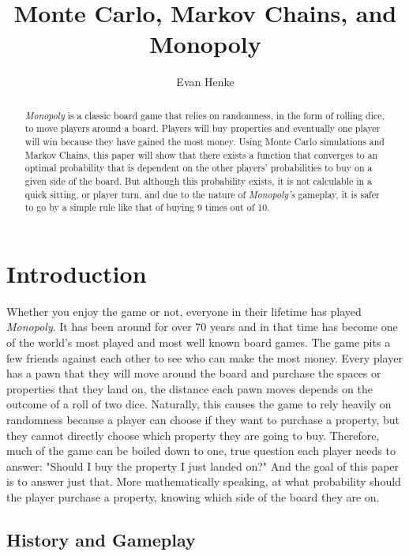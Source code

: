 \documentclass{article}
\begin{document}
\title{Monte Carlo, Markov Chains, and Monopoly}
\author{Evan Henke}

\maketitle

\begin{abstract}
\textit{Monopoly} is a classic board game that relies on randomness, in the form of rolling dice, to move players around a board.  Players will buy properties and eventually one player will win because they have gained the most money.  Using Monte Carlo simulations and Markov Chains, this paper will show that there exists a function that converges to an optimal probability that is dependent on the other players' probabilities to buy on a given side of the board.  But although this probability exists, it is not calculable in a quick sitting, or player turn, and due to the nature of \textit{Monopoly's} gameplay, it is safer to go by a simple rule like that of buying 9 times out of 10.
\end{abstract}


\section{Introduction}

Whether you enjoy the game or not, everyone in their lifetime has played  \textit{Monopoly}.  It has been around for over 70 years and in that time has become one of the world’s most played and most well known board games.  The game pits a few friends against each other to see who can make the most money.  Every player has a pawn that they will move around the board and purchase the spaces or properties that they land on, the distance each pawn moves depends on the outcome of a roll of two dice.  Naturally, this causes the game to rely heavily on randomness because a player can choose if they want to purchase a property, but they cannot directly choose which property they are going to buy. Therefore, much of the game can be boiled down to one, true question each player needs to answer: "Should I buy the property I just landed on?"  And the goal of this paper is to answer just that.  More mathematically speaking, at what probability should the player purchase a property, knowing which side of the board they are on.

\subsection{History and Gameplay}
\end{document}
